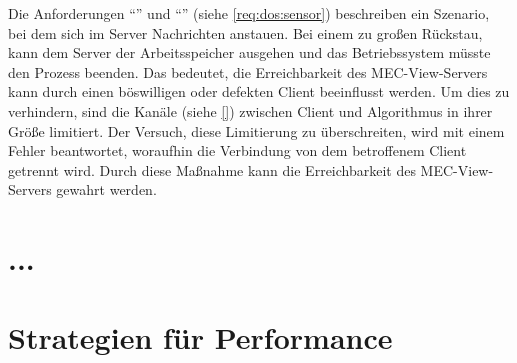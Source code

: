Die Anforderungen  \enquote{} und  \enquote{} (siehe \autoref{req:dos:sensor}) beschreiben ein Szenario, bei dem sich im Server Nachrichten anstauen.
Bei einem zu großen Rückstau, kann dem Server der Arbeitsspeicher ausgehen und das Betriebssystem müsste den Prozess beenden.
Das bedeutet, die Erreichbarkeit des MEC-View-Servers kann durch einen böswilligen oder defekten Client beeinflusst werden.
Um dies zu verhindern, sind die Kanäle (siehe \autoref{}) zwischen Client und Algorithmus in ihrer Größe limitiert.
Der Versuch, diese Limitierung zu überschreiten, wird mit einem Fehler beantwortet, woraufhin die Verbindung von dem betroffenem Client getrennt wird.
Durch diese Maßnahme kann die Erreichbarkeit des MEC-View-Servers gewahrt werden.

\clearpage

\section{...}






\section{Strategien für Performance}











	
